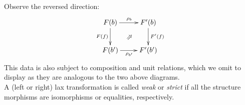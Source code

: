 \begin{defn}
\begin{itemize}
        \end{itemize}
      Observe the reversed direction:
      \begin{displaymath}
        \xymatrix{
          F(b)
            \ar[r]^{\rho_b}
            \ar[d]_{F(f)}
            \ar@{}[dr]|*\objectbox{\rotatebox{225}{$\Leftarrow$}}
          &
          F^\prime(b)
            \ar[d]^{F^\prime(f)}
          \\
          F(b^\prime) 
            \ar[r]_{\rho_{b^\prime}}
          &
          F^\prime(b^\prime)
        }
      \end{displaymath}
      This data is also subject to composition and unit relations, which we omit to display as they are analogous to the two above diagrams.\\
      A (left or right) lax transformation is called  \emph{weak} or \emph{strict} if all the structure morphisms are isomorphisms or equalities, respectively.
    \end{defn}

